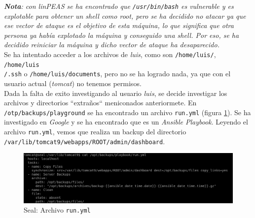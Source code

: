 \textit{\textbf{Nota}: con linPEAS se ha encontrado que \texttt{/usr/bin/bash} es vulnerable y es explotable para obtener un shell como root, pero se ha decidido no atacar ya que ese vector de ataque es el objetivo de esta máquina, lo que significa que otra persona ya había explotado la máquina y conseguido una shell. Por eso, se ha decidido reiniciar la máquina y dicho vector de ataque ha desaparecido.}\\

Se ha intentado acceder a los archivos de \textit{luis}, como son \texttt{/home/luis/}, \texttt{/home/luis\\/.ssh} o \texttt{/home/luis/documents}, pero no se ha logrado nada, ya que con el usuario actual (\textit{tomcat}) no tenemos permisos.\\

Dada la falta de exito investigando al usuario \textit{luis}, se decide investigar los archivos y directorios ``extraños`` meniconados anteriormete. En \texttt{/otp/backups/playground} se ha encontrado un archivo \texttt{run.yml} (figura \ref{fig:seal-run}). Se ha investigado en \textit{Google} y se ha encontrado que es un \textit{Ansible Playbook}\cite{ansible-playbooks}. Leyendo el archivo \texttt{run.yml}, vemos que realiza un backup del directorio \texttt{/var/lib/tomcat9/webapps/ROOT/admin/dashboard}.\\

\begin{figure}[h]
    \centering
    \includegraphics[width=1.0\textwidth]{images/machines/seal/run-yml.png}
    \caption{Seal: Archivo \texttt{run.yml}}
    \label{fig:seal-run}
\end{figure}


